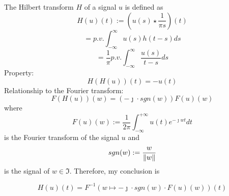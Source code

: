\documentclass[12pt]{article}
\begin{document}
The Hilbert transform $H$ of a signal $u$ is defined as
$$H(u)(t):= (u(s) \star \frac{1}{\pi s})(t)$$
$$= p.v. \int_{-\infty}^{\infty} u(s) h(t-s) ds$$
$$= \frac{1}{\pi} p.v. \int_{-\infty}^{\infty} \frac{u(s)}{t-s} ds$$
Property:
$$H(H(u))(t) = -u(t)$$
Relationship to the Fourier transform:
$$F(H(u))(w)=(-\jmath \cdot sgn(w)) F(u)(w)$$
where
$$F(u)(w):=\frac{1}{2\pi} \int_{-\infty}^{+\infty} u(t)e^{-\jmath w t} dt$$
is the Fourier transform of the signal $u$ and
$$sgn(w):=\frac{w}{\Arrowvert w \Arrowvert}$$
is the signal of $w \in \Im$. Therefore, my conclusion is

$$H(u)(t) = F^{-1}(w \mapsto -\jmath \cdot sgn(w) \cdot F(u)(w))(t)$$
\end{document}
